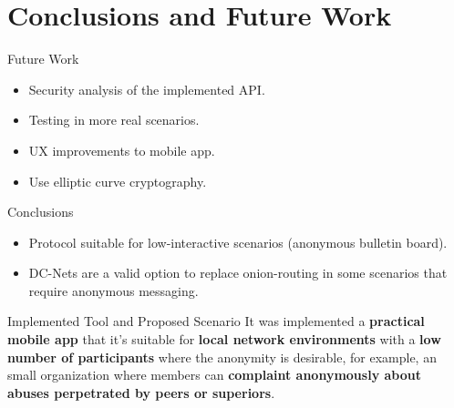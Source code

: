 \section{Conclusions and Future Work}

\begin{frame}{Future Work}
    \begin{itemize}
        \item Security analysis of the implemented API.
        \item Testing in more real scenarios.
        \item UX improvements to mobile app.
        \item Use elliptic curve cryptography.
    \end{itemize}
\end{frame}

\begin{frame}{Conclusions}
    \begin{itemize}
        \item Protocol suitable for low-interactive scenarios (anonymous bulletin board).
        \item DC-Nets are a valid option to replace onion-routing in some scenarios that require anonymous messaging.
    \end{itemize}
\end{frame}

\begin{frame}{Implemented Tool and Proposed Scenario}
\justify
It was implemented a \textbf{practical mobile app} that it's suitable for \textbf{local network environments} with a \textbf{low number of participants} where the anonymity is desirable, for example, an small organization where members can \textbf{complaint anonymously about abuses perpetrated by peers or superiors}.
\end{frame}
